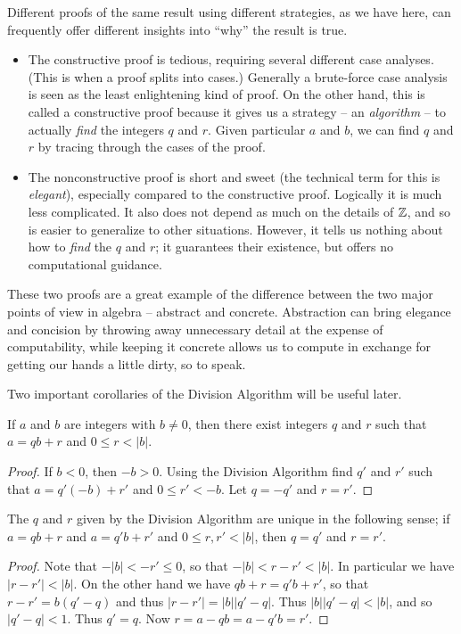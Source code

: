 Different proofs of the same result using different strategies, as we have here, can frequently offer different insights into ``why'' the result is true.
\begin{itemize}
\item The constructive proof is tedious, requiring several different case analyses. (This is when a proof splits into cases.) Generally a brute-force case analysis is seen as the least enlightening kind of proof. On the other hand, this is called a constructive proof because it gives us a strategy -- an \emph{algorithm} -- to actually \emph{find} the integers \(q\) and \(r\). Given particular \(a\) and \(b\), we can find \(q\) and \(r\) by tracing through the cases of the proof.

\item The nonconstructive proof is short and sweet (the technical term for this is \emph{elegant}), especially compared to the constructive proof. Logically it is much less complicated. It also does not depend as much on the details of \(\mathbb{Z}\), and so is easier to generalize to other situations. However, it tells us nothing about how to \emph{find} the \(q\) and \(r\); it guarantees their existence, but offers no computational guidance.
\end{itemize}

These two proofs are a great example of the difference between the two major points of view in algebra -- abstract and concrete. Abstraction can bring elegance and concision by throwing away unnecessary detail at the expense of computability, while keeping it concrete allows us to compute in exchange for getting our hands a little dirty, so to speak.

Two important corollaries of the Division Algorithm will be useful later.

\begin{cor}
If \(a\) and \(b\) are integers with \(b \neq 0\), then there exist integers \(q\) and \(r\) such that \(a = qb + r\) and \(0 \leq r < |b|\).
\end{cor}

\begin{proof}
If \(b < 0\), then \(-b > 0\). Using the Division Algorithm find \(q'\) and \(r'\) such that \(a = q'(-b) + r'\) and \(0 \leq r' < -b\). Let \(q = -q'\) and \(r = r'\).
\end{proof}

\begin{cor}
The \(q\) and \(r\) given by the Division Algorithm are unique in the following sense; if \(a = qb + r\) and \(a = q'b + r'\) and \(0 \leq r,r' < |b|\), then \(q = q'\) and \(r = r'\).
\end{cor}

\begin{proof}
Note that \(-|b| < -r' \leq 0\), so that \(-|b| < r-r' < |b|\). In particular we have \(|r-r'| < |b|\). On the other hand we have \(qb+r = q'b+r'\), so that \(r-r' = b(q'-q)\) and thus \(|r-r'| = |b||q'-q|\). Thus \(|b||q'-q| < |b|\), and so \(|q'-q| < 1\). Thus \(q' = q\). Now \(r = a - qb = a - q'b = r'\).
\end{proof}
